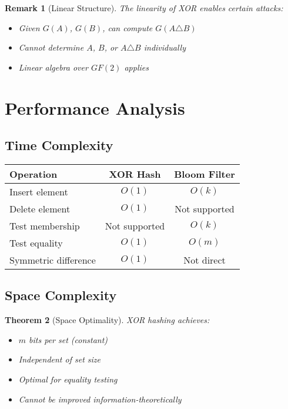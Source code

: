 \documentclass[11pt,final,hidelinks]{article}
\newcommand{\SymDiff}{\triangle}
\newtheorem{theorem}{Theorem}[section]
\newtheorem{remark}[theorem]{Remark}
\begin{document}
\begin{remark}[Linear Structure]
The linearity of XOR enables certain attacks:
\begin{itemize}
    \item Given $G(A)$, $G(B)$, can compute $G(A \SymDiff B)$
    \item Cannot determine $A$, $B$, or $A \SymDiff B$ individually
    \item Linear algebra over $GF(2)$ applies
\end{itemize}
\end{remark}

\section{Performance Analysis}

\subsection{Time Complexity}

\begin{center}
\begin{tabular}{lcc}
\toprule
\textbf{Operation} & \textbf{XOR Hash} & \textbf{Bloom Filter} \\
\midrule
Insert element & $O(1)$ & $O(k)$ \\
Delete element & $O(1)$ & Not supported \\
Test membership & Not supported & $O(k)$ \\
Test equality & $O(1)$ & $O(m)$ \\
Symmetric difference & $O(1)$ & Not direct \\
\bottomrule
\end{tabular}
\end{center}

\subsection{Space Complexity}

\begin{theorem}[Space Optimality]
XOR hashing achieves:
\begin{itemize}
    \item $m$ bits per set (constant)
    \item Independent of set size
    \item Optimal for equality testing
    \item Cannot be improved information-theoretically
\end{itemize}
\end{theorem}
\end{document}

